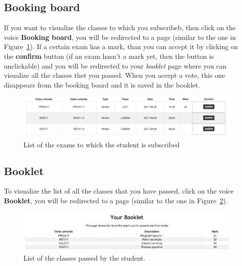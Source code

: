 \subsection{Booking board}
If you want to visualize the classes to which you subscribeb, then click on the voice \textbf{Booking board}, you will be redirected to a page (similar to the one in Figure~\ref{fig:studentRecords}).  If a certain exam has a mark, than you can accept it by clicking on the \textbf{confirm} button (if an exam hasn't a mark yet, then the button is unclickable) and you will be redirected to your \emph{booklet} page where you can visualize all the classes thet you passed. When you accept a vote, this one disappears from the booking board and it is saved in the booklet.
\begin{figure}[H]
	\centering
	\includegraphics[width=1.0\textwidth]{img/studentRecords.png}
	\caption{List of the exams to which the student is subscribed}
	\label{fig:studentRecords}
\end{figure}

\subsection{Booklet}
To visualize the list of  all the classes that you have passed, click on the voice \textbf{Booklet}, you will be redirected to a page (similar to the one in Figure~\ref{fig:booklet}).
\begin{figure}[H]
	\centering
	\includegraphics[width=1.0\textwidth]{img/booklet.png}
	\caption{List of the classes passed by the student.}
	\label{fig:booklet}
\end{figure}